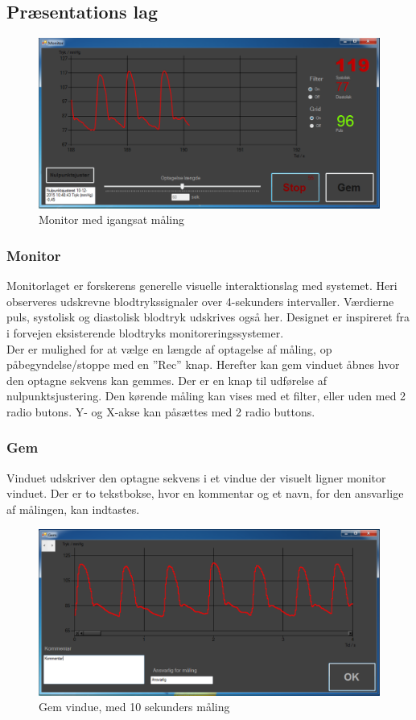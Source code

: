 \subsection{Præsentations lag}
\begin{figure}[H]
	\centering
	\includegraphics[width=1\textwidth]{Figurer/Monitor_vindue_Recording}
	\caption{Monitor med igangsat måling}
\end{figure}

\subsubsection{Monitor}
Monitorlaget er forskerens generelle visuelle interaktionslag med systemet. Heri observeres udskrevne blodtrykssignaler over 4-sekunders intervaller. Værdierne puls, systolisk og diastolisk blodtryk udskrives også her. Designet er inspireret fra i forvejen eksisterende blodtryks monitoreringssystemer. \\
Der er mulighed for at vælge en længde af optagelse af måling, op påbegyndelse/stoppe med en ”Rec” knap. Herefter kan gem vinduet åbnes hvor den optagne sekvens kan gemmes. Der er en knap til udførelse af nulpunktsjustering. Den kørende måling kan vises med et filter, eller uden med 2 radio butons. Y- og X-akse kan påsættes med 2 radio buttons. 

\subsubsection{Gem}
Vinduet udskriver den optagne sekvens i et vindue der visuelt ligner monitor vinduet. Der er to tekstbokse, hvor en kommentar og et navn, for den ansvarlige af målingen, kan indtastes.
\begin{figure}[H]
	\centering
	\includegraphics[width=1\textwidth]{Figurer/Gem}
	\caption{Gem vindue, med 10 sekunders måling}
\end{figure}

